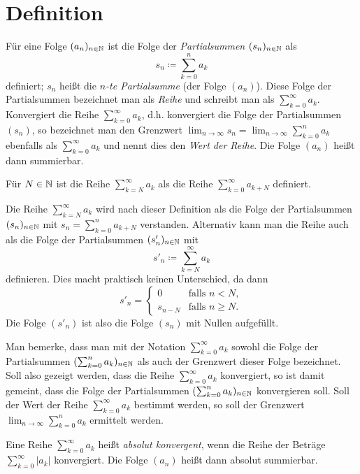 \documentclass[a4paper,10pt]{article}
\begin{document}
\section{Definition}


\begin{defi}
 Für eine Folge $(a_n)_{n \in \mathbb{N}}$ ist die Folge der \emph{Partialsummen} $(s_n)_{n \in \mathbb{N}}$ als
 \[
  s_n \coloneqq \sum_{k=0}^n a_k
 \]
 definiert; $s_n$ heißt die \emph{$n$-te Partialsumme} (der Folge $(a_n)$). Diese Folge der Partialsummen bezeichnet man als \emph{Reihe} und schreibt man als $\sum_{k=0}^\infty a_k$. Konvergiert die Reihe $\sum_{k=0}^\infty a_k$, d.h. konvergiert die Folge der Partialsummen $(s_n)$, so bezeichnet man den Grenzwert $\lim_{n \to \infty} s_n = \lim_{n \to \infty} \sum_{k=0}^n a_k$ ebenfalls als $\sum_{k=0}^\infty a_k$ und nennt dies den \emph{Wert der Reihe}. Die Folge $(a_n)$ heißt dann summierbar.
 
 Für $N \in \mathbb{N}$ ist die Reihe $\sum_{k=N}^\infty a_k$ als die Reihe $\sum_{k=0}^\infty a_{k+N}$ definiert.  
\end{defi}


\begin{bem}
 Die Reihe $\sum_{k=N}^\infty a_k$ wird nach dieser Definition als die Folge der Partialsummen $(s_n)_{n \in \mathbb{N}}$ mit $s_n = \sum_{k=0}^n a_{k+N}$ verstanden. Alternativ kann man die Reihe auch als die Folge der Partialsummen $(s'_n)_{n \in \mathbb{N}}$ mit
 \[
  s'_n \coloneqq \sum_{k=N}^\infty a_k
 \]
 definieren. Dies macht praktisch keinen Unterschied, da dann
 \[
  s'_n =
  \begin{cases}
   0       & \text{falls } n < N, \\
   s_{n-N} & \text{falls } n \geq N.
  \end{cases}
 \]
 Die Folge $(s'_n)$ ist also die Folge $(s_n)$ mit Nullen aufgefüllt.
\end{bem}


Man bemerke, dass man mit der Notation $\sum_{k=0}^\infty a_k$ sowohl die Folge der Partialsummen $(\sum_{k=0}^n a_k)_{n \in \mathbb{N}}$ als auch der Grenzwert dieser Folge bezeichnet. Soll also gezeigt werden, dass die Reihe $\sum_{k=0}^\infty a_k$ konvergiert, so ist damit gemeint, dass die Folge der Partialsummen $(\sum_{k=0}^n a_k)_{n \in \mathbb{N}}$ konvergieren soll. Soll der Wert der Reihe $\sum_{k=0}^\infty a_k$ bestimmt werden, so soll der Grenzwert $\lim_{n \to \infty} \sum_{k=0}^n a_k$ ermittelt werden.


\begin{defi}
 Eine Reihe $\sum_{k=0}^\infty a_k$ heißt \emph{absolut konvergent}, wenn die Reihe der Beträge $\sum_{k=0}^\infty |a_k|$ konvergiert. Die Folge $(a_n)$ heißt dann absolut summierbar.
\end{defi}
\end{document}

